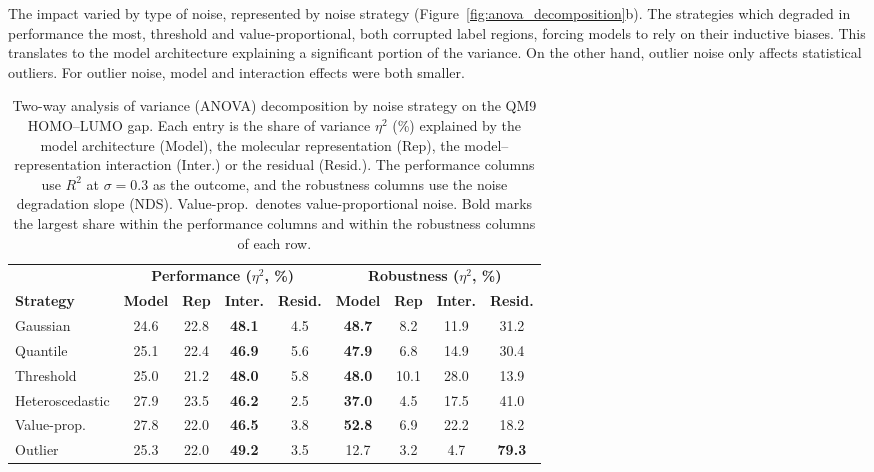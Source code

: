 The impact varied by type of noise, represented by noise strategy (Figure~\ref{fig:anova_decomposition}b). The strategies which degraded in performance the most, threshold and value-proportional, both corrupted label regions, forcing models to rely on their inductive biases. This translates to the model architecture explaining a significant portion of the variance. On the other hand, outlier noise only affects statistical outliers. For outlier noise, model and interaction effects were both smaller.

\begin{table}[htbp]
\centering
\small
\begin{adjustbox}{max width=\textwidth}
\begin{tabular}{lcccccccc}
\toprule
& \multicolumn{4}{c}{\textbf{Performance ($\eta^2$, \%)}} & \multicolumn{4}{c}{\textbf{Robustness ($\eta^2$, \%)}} \\
\cmidrule(lr){2-5} \cmidrule(lr){6-9}
\textbf{Strategy} & \textbf{Model} & \textbf{Rep} & \textbf{Inter.} & \textbf{Resid.} & \textbf{Model} & \textbf{Rep} & \textbf{Inter.} & \textbf{Resid.} \\
\midrule
Gaussian        & 24.6 & 22.8 & \textbf{48.1} &  4.5 & \textbf{48.7} &  8.2 & 11.9 & 31.2 \\
Quantile        & 25.1 & 22.4 & \textbf{46.9} &  5.6 & \textbf{47.9} &  6.8 & 14.9 & 30.4 \\
Threshold       & 25.0 & 21.2 & \textbf{48.0} &  5.8 & \textbf{48.0} & 10.1 & 28.0 & 13.9 \\
Heteroscedastic & 27.9 & 23.5 & \textbf{46.2} &  2.5 & \textbf{37.0} &  4.5 & 17.5 & 41.0 \\
Value-prop.     & 27.8 & 22.0 & \textbf{46.5} &  3.8 & \textbf{52.8} &  6.9 & 22.2 & 18.2 \\
Outlier         & 25.3 & 22.0 & \textbf{49.2} &  3.5 & 12.7 &  3.2 &  4.7 & \textbf{79.3} \\
\bottomrule
\end{tabular}
\end{adjustbox}
\caption[ANOVA variance decomposition by noise strategy on QM9.]{Two-way analysis of variance (ANOVA) decomposition by noise strategy on the QM9 HOMO--LUMO gap. Each entry is the share of variance $\eta^2$ (\%) explained by the model architecture (Model), the molecular representation (Rep), the model--representation interaction (Inter.) or the residual (Resid.). The performance columns use $R^2$ at $\sigma = 0.3$ as the outcome, and the robustness columns use the noise degradation slope (NDS). Value-prop.\ denotes value-proportional noise. Bold marks the largest share within the performance columns and within the robustness columns of each row.}
\label{tab:anova_decomposition}
\end{table}

